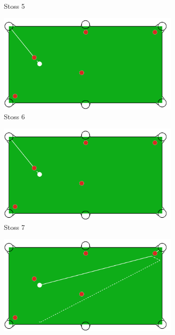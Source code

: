 \begin{figure}[h!]
\begin{subfigure}[b]{0.3\textwidth}
        \caption{Stoss 5}
        \label{fig:situation_velocity_1_solution_5}
    \end{subfigure}
    \hfill
    \begin{subfigure}[b]{0.3\textwidth}
        \centering
        \includegraphics[width=1.0\linewidth]{../common/04_results/resources/simple_search/situation_diverse_solution_velocity_6.PNG}
        \caption{Stoss 6}
        \label{fig:situation_velocity_1_solution_6}
    \end{subfigure}
    \hfill
    \begin{subfigure}[b]{0.3\textwidth}
        \centering
        \includegraphics[width=1.0\linewidth]{../common/04_results/resources/simple_search/situation_diverse_solution_velocity_7.PNG}
        \caption{Stoss 7}
        \label{fig:situation_velocity_1_solution_7}
    \end{subfigure}
    \hfill
    \begin{subfigure}[b]{0.3\textwidth}
        \centering
        \includegraphics[width=1.0\linewidth]{../common/04_results/resources/simple_search/situation_diverse_solution_velocity_8.PNG}

\end{subfigure}
\end{figure}
